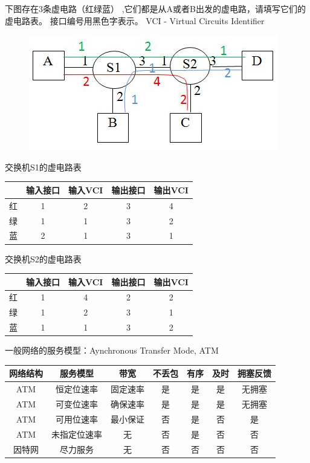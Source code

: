 \begin{example}
	下图存在3条虚电路（红绿蓝） ,它们都是从A或者B出发的虚电路，请填写它们的虚电路表。
	接口编号用黑色字表示。 VCI - Virtual Circuits Identifier
	\begin{figure}[H]
		\centering
		\includegraphics[width=0.6\linewidth]{fig/virtual_circuit.png}
	\end{figure}
\end{example}
\begin{analysis}
交换机S1的虚电路表
\begin{center}
\begin{tabular}{ccccc}\hline
 & 输入接口 & 输入VCI & 输出接口 & 输出VCI\\\hline
红 & 1 & 2 & 3 & 4\\
绿 & 1 & 1 & 3 & 2\\
蓝 & 2 & 1 & 3 & 1\\\hline
\end{tabular}
\end{center}
交换机S2的虚电路表
\begin{center}
\begin{tabular}{ccccc}\hline
 & 输入接口 & 输入VCI & 输出接口 & 输出VCI\\\hline
红 & 1 & 4 & 2 & 2\\
绿 & 1 & 2 & 3 & 1\\
蓝 & 1 & 1 & 3 & 2\\\hline
\end{tabular}
\end{center}
\end{analysis}

一般网络的服务模型：Aynchronous Transfer Mode, ATM
\begin{center}
\begin{tabular}{|c|c|c|c|c|c|c|}\hline
网络结构 & 服务模型 & 带宽 & 不丢包 & 有序 & 及时 & 拥塞反馈\\\hline
ATM & 恒定位速率 & 固定速率 & 是 & 是 & 是 & 无拥塞\\\hline
ATM & 可变位速率 & 确保速率 & 是 & 是 & 是 & 无拥塞\\\hline
ATM & 可用位速率 & 最小保证 & 否 & 是 & 否 & 是\\\hline
ATM & 未指定位速率 & 无 & 否 & 是 & 否 & 否\\\hline
因特网 & 尽力服务 & 无 & 否 & 否 & 否 & 否\\\hline
\end{tabular}
\end{center}

